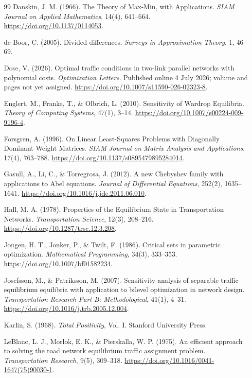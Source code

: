 \begin{thebibliography}{99}
Danskin, J. M. (1966). The Theory of Max-Min, with Applications. \emph{SIAM Journal on Applied Mathematics}, 14(4), 641--664. \url{https://doi.org/10.1137/0114053}.

de Boor, C. (2005). Divided differences. \emph{Surveys in Approximation Theory}, 1, 46--69.

Dose, V. (2026). Optimal traffic conditions in two-link parallel networks with polynomial costs. \emph{Optimization Letters}. Published online 4 July 2026; volume and pages not yet assigned. \url{https://doi.org/10.1007/s11590-026-02323-8}.

Englert, M., Franke, T., \& Olbrich, L. (2010). Sensitivity of Wardrop Equilibria. \emph{Theory of Computing Systems}, 47(1), 3--14. \url{https://doi.org/10.1007/s00224-009-9196-4}.

Forsgren, A. (1996). On Linear Least-Squares Problems with Diagonally Dominant Weight Matrices. \emph{SIAM Journal on Matrix Analysis and Applications}, 17(4), 763--788. \url{https://doi.org/10.1137/s0895479895284014}.

Gasull, A., Li, C., \& Torregrosa, J. (2012). A new Chebyshev family with applications to Abel equations. \emph{Journal of Differential Equations}, 252(2), 1635--1641. \url{https://doi.org/10.1016/j.jde.2011.06.010}.

Hall, M. A. (1978). Properties of the Equilibrium State in Transportation Networks. \emph{Transportation Science}, 12(3), 208--216. \url{https://doi.org/10.1287/trsc.12.3.208}.

Jongen, H. T., Jonker, P., \& Twilt, F. (1986). Critical sets in parametric optimization. \emph{Mathematical Programming}, 34(3), 333--353. \url{https://doi.org/10.1007/bf01582234}.

Josefsson, M., \& Patriksson, M. (2007). Sensitivity analysis of separable traffic equilibrium equilibria with application to bilevel optimization in network design. \emph{Transportation Research Part B: Methodological}, 41(1), 4--31. \url{https://doi.org/10.1016/j.trb.2005.12.004}.

Karlin, S. (1968). \emph{Total Positivity}, Vol. I. Stanford University Press.

LeBlanc, L. J., Morlok, E. K., \& Pierskalla, W. P. (1975). An efficient approach to solving the road network equilibrium traffic assignment problem. \emph{Transportation Research}, 9(5), 309--318. \url{https://doi.org/10.1016/0041-1647(75)90030-1}.


\end{thebibliography}
